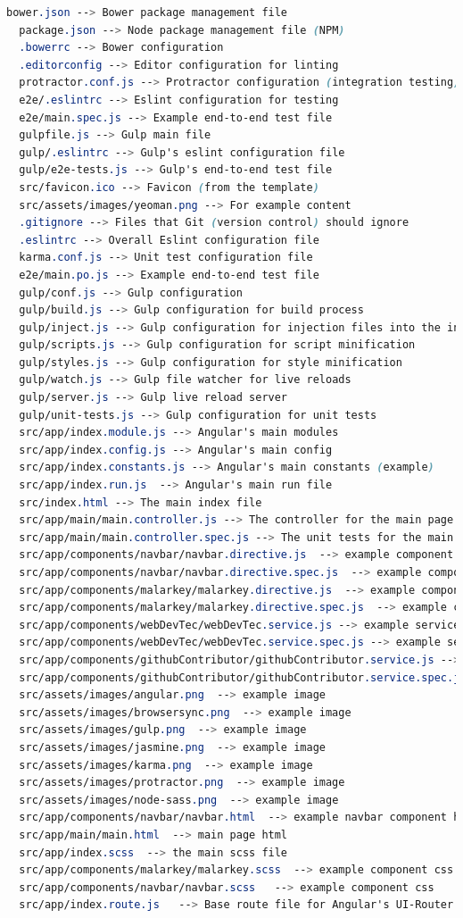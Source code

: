 \begin{lstlisting}[language=CSS]
  bower.json --> Bower package management file
  package.json --> Node package management file (NPM)
  .bowerrc --> Bower configuration
  .editorconfig --> Editor configuration for linting
  protractor.conf.js --> Protractor configuration (integration testing)
  e2e/.eslintrc --> Eslint configuration for testing
  e2e/main.spec.js --> Example end-to-end test file
  gulpfile.js --> Gulp main file
  gulp/.eslintrc --> Gulp's eslint configuration file
  gulp/e2e-tests.js --> Gulp's end-to-end test file
  src/favicon.ico --> Favicon (from the template)
  src/assets/images/yeoman.png --> For example content
  .gitignore --> Files that Git (version control) should ignore
  .eslintrc --> Overall Eslint configuration file
  karma.conf.js --> Unit test configuration file
  e2e/main.po.js --> Example end-to-end test file
  gulp/conf.js --> Gulp configuration
  gulp/build.js --> Gulp configuration for build process
  gulp/inject.js --> Gulp configuration for injection files into the index.html
  gulp/scripts.js --> Gulp configuration for script minification
  gulp/styles.js --> Gulp configuration for style minification
  gulp/watch.js --> Gulp file watcher for live reloads
  gulp/server.js --> Gulp live reload server
  gulp/unit-tests.js --> Gulp configuration for unit tests
  src/app/index.module.js --> Angular's main modules
  src/app/index.config.js --> Angular's main config
  src/app/index.constants.js --> Angular's main constants (example)
  src/app/index.run.js  --> Angular's main run file
  src/index.html --> The main index file
  src/app/main/main.controller.js --> The controller for the main page (example)
  src/app/main/main.controller.spec.js --> The unit tests for the main page (example)
  src/app/components/navbar/navbar.directive.js  --> example component
  src/app/components/navbar/navbar.directive.spec.js  --> example component unit tests
  src/app/components/malarkey/malarkey.directive.js  --> example component
  src/app/components/malarkey/malarkey.directive.spec.js  --> example component unit tests
  src/app/components/webDevTec/webDevTec.service.js --> example service
  src/app/components/webDevTec/webDevTec.service.spec.js --> example service test
  src/app/components/githubContributor/githubContributor.service.js --> example service
  src/app/components/githubContributor/githubContributor.service.spec.js  --> example service test
  src/assets/images/angular.png  --> example image
  src/assets/images/browsersync.png  --> example image
  src/assets/images/gulp.png  --> example image
  src/assets/images/jasmine.png  --> example image
  src/assets/images/karma.png  --> example image
  src/assets/images/protractor.png  --> example image
  src/assets/images/node-sass.png  --> example image
  src/app/components/navbar/navbar.html  --> example navbar component html
  src/app/main/main.html  --> main page html
  src/app/index.scss  --> the main scss file
  src/app/components/malarkey/malarkey.scss  --> example component css
  src/app/components/navbar/navbar.scss   --> example component css
  src/app/index.route.js   --> Base route file for Angular's UI-Router
\end{lstlisting}

